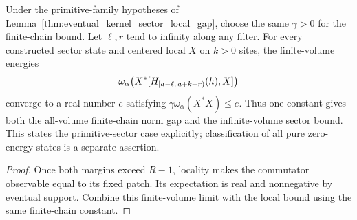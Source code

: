 \begin{lemma}
    \label{thm:eventual_kernel_sector_literal_gap}
    \leanok
    Under the primitive-family hypotheses of
    Lemma~\ref{thm:eventual_kernel_sector_local_gap}, choose the same
    $\gamma>0$ for the finite-chain bound. Let $\ell,r$ tend to infinity
    along any filter. For every constructed sector state and centered local
    $X$ on $k>0$ sites, the finite-volume energies
    \begin{align}
        \omega_\alpha\bigl(X^*[H_{[a-\ell,\,a+k+r)}(h),X]\bigr)
        \notag
    \end{align}
    converge to a real number $e$ satisfying
    $\gamma\omega_\alpha(X^*X)\leq e$. Thus one constant gives both the
    all-volume finite-chain norm gap and the infinite-volume sector bound.
    This states the primitive-sector case explicitly; classification of all
    pure zero-energy states is a separate assertion.
\end{lemma}
\begin{proof}\leanok
    Once both margins exceed $R-1$, locality makes the commutator observable
    equal to its fixed patch. Its expectation is real and nonnegative by
    eventual support. Combine this finite-volume limit with the local bound using
    the same finite-chain constant.
\end{proof}

